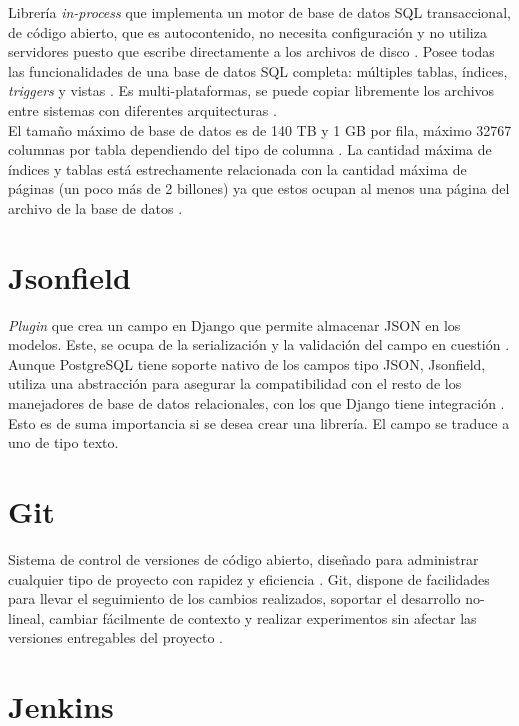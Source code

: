 Librería \textit{in-process} que implementa un motor de base de datos SQL transaccional, de código abierto, que es autocontenido, no necesita configuración y no utiliza servidores puesto que escribe directamente a los archivos de disco \cite{SQLite}. Posee todas las funcionalidades de una base de datos SQL completa: múltiples tablas, índices, \textit{triggers} y vistas \cite{SQLite}.  Es multi-plataformas, se puede copiar libremente los archivos entre sistemas con diferentes arquitecturas \cite{SQLite}. \\

El tamaño máximo de base de datos es de 140 TB y 1 GB por fila, máximo 32767 columnas por tabla dependiendo del tipo de columna \cite{SQLite}. La cantidad máxima de índices y tablas está estrechamente relacionada con la cantidad máxima de páginas (un poco más de 2 billones) ya que estos ocupan al menos una página del archivo de la base de datos \cite{SQLite}.

\section{Jsonfield}

\textit{Plugin} que crea un campo en Django que permite almacenar JSON en los modelos. Este, se ocupa de la serialización y la validación del campo en cuestión \cite{jsonfield}. Aunque PostgreSQL tiene soporte nativo de los campos tipo JSON, Jsonfield, utiliza una abstracción para asegurar la compatibilidad con el resto de los manejadores de base de datos relacionales, con los que Django tiene integración \cite{jsonfield}. Esto es de suma importancia si se desea crear una librería. El campo se traduce a uno de tipo texto.

\section{Git}

Sistema de control de versiones de código abierto, diseñado para administrar cualquier tipo de proyecto con rapidez y eficiencia \cite{Git}. Git, dispone de facilidades para llevar el seguimiento de los cambios realizados, soportar el desarrollo no-lineal, cambiar fácilmente de contexto y realizar experimentos sin afectar las versiones entregables del proyecto \cite{Git}.

\section{Jenkins}

